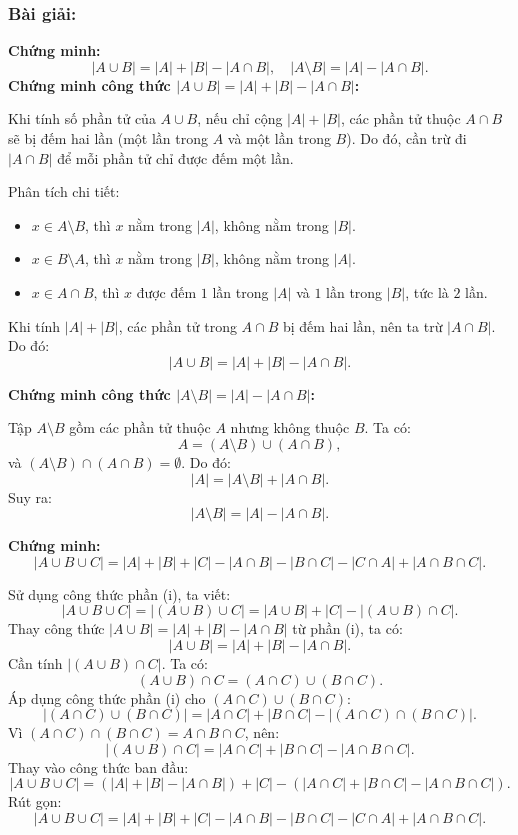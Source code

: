 \documentclass[a4paper,12pt]{article}
\begin{document}
\subsubsection*{Bài giải:}

\textbf{ Chứng minh:
\[
|A \cup B| = |A| + |B| - |A \cap B|, \quad |A \setminus B| = |A| - |A \cap B|.
\]
}
\textbf{Chứng minh công thức $|A \cup B| = |A| + |B| - |A \cap B|$:}

Khi tính số phần tử của $A \cup B$, nếu chỉ cộng $|A| + |B|$, các phần tử thuộc $A \cap B$ sẽ bị đếm hai lần (một lần trong $A$ và một lần trong $B$). Do đó, cần trừ đi $|A \cap B|$ để mỗi phần tử chỉ được đếm một lần.

Phân tích chi tiết:
\begin{itemize}
    \item $x \in A \setminus B$, thì $x$ nằm trong $|A|$, không nằm trong $|B|$.
    \item $x \in B \setminus A$, thì $x$ nằm trong $|B|$, không nằm trong $|A|$.
    \item $x \in A \cap B$, thì $x$ được đếm $1$ lần trong $|A|$ và $1$ lần trong $|B|$, tức là $2$ lần.
\end{itemize}
Khi tính $|A| + |B|$, các phần tử trong $A \cap B$ bị đếm hai lần, nên ta trừ $|A \cap B|$. Do đó:
\[
|A \cup B| = |A| + |B| - |A \cap B|.
\]

\textbf{Chứng minh công thức $|A \setminus B| = |A| - |A \cap B|$:}

Tập $A \setminus B$ gồm các phần tử thuộc $A$ nhưng không thuộc $B$. Ta có:
\[
A = (A \setminus B) \cup (A \cap B),
\]
và $(A \setminus B) \cap (A \cap B) = \emptyset$. Do đó:
\[
|A| = |A \setminus B| + |A \cap B|.
\]
Suy ra:
\[
|A \setminus B| = |A| - |A \cap B|.
\]

\textbf*{Chứng minh:
\[
|A \cup B \cup C| = |A| + |B| + |C| - |A \cap B| - |B \cap C| - |C \cap A| + |A \cap B \cap C|.
\]}

Sử dụng công thức phần (i), ta viết:
\[
|A \cup B \cup C| = |(A \cup B) \cup C| = |A \cup B| + |C| - |(A \cup B) \cap C|.
\]
Thay công thức $|A \cup B| = |A| + |B| - |A \cap B|$ từ phần (i), ta có:
\[
|A \cup B| = |A| + |B| - |A \cap B|.
\]
Cần tính $|(A \cup B) \cap C|$. Ta có:
\[
(A \cup B) \cap C = (A \cap C) \cup (B \cap C).
\]
Áp dụng công thức phần (i) cho $(A \cap C) \cup (B \cap C)$:
\[
|(A \cap C) \cup (B \cap C)| = |A \cap C| + |B \cap C| - |(A \cap C) \cap (B \cap C)|.
\]
Vì $(A \cap C) \cap (B \cap C) = A \cap B \cap C$, nên:
\[
|(A \cup B) \cap C| = |A \cap C| + |B \cap C| - |A \cap B \cap C|.
\]
Thay vào công thức ban đầu:
\[
|A \cup B \cup C| = (|A| + |B| - |A \cap B|) + |C| - (|A \cap C| + |B \cap C| - |A \cap B \cap C|).
\]
Rút gọn:
\[
|A \cup B \cup C| = |A| + |B| + |C| - |A \cap B| - |B \cap C| - |C \cap A| + |A \cap B \cap C|.
\]
\end{document}
